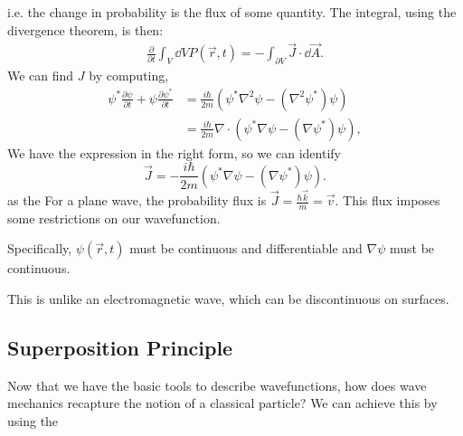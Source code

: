 \documentclass{article}
\numberwithin{equation}{section}
\begin{document}
i.e. the change in probability is the flux of some quantity. The integral, using the divergence theorem, is then:
\begin{align*}
    \frac{\partial}{\partial t}\int_V \dd{V} P(\vec{r},t) = -\int_{\partial V} \vec{J} \cdot \dd{\vec{A}}.
\end{align*}
We can find $J$ by computing,
\begin{align*}
    \psi^*\frac{\partial \psi}{\partial t} + \psi \frac{\partial \psi^*}{\partial t} &= \frac{i\hbar}{2m}\left(\psi^*\nabla^2\psi - (\nabla^2\psi^*)\psi\right) \\ 
    &= \frac{i\hbar}{2m}\nabla \cdot \left(\psi^*\nabla\psi - (\nabla \psi^*)\psi\right),
\end{align*}
We have the expression in the right form, so we can identify
\begin{equation}
    \vec{J} = -\frac{i\hbar}{2m}\left(\psi^* \nabla \psi - (\nabla \psi^*)\psi\right).
\end{equation}
as the  For a plane wave, the probability flux is $\vec{J} = \frac{\hbar \vec{k}}{m} = \vec{v}.$ This flux imposes some restrictions on our wavefunction.
\begin{lemma}
    Specifically, $\psi(\vec{r},t)$ must be continuous and differentiable and $\nabla \psi$ must be continuous.
\end{lemma}
This is unlike an electromagnetic wave, which can be discontinuous on surfaces.
\subsection{Superposition Principle}
Now that we have the basic tools to describe wavefunctions, how does wave mechanics recapture the notion of a classical particle? We can achieve this by using the 
\end{document}
